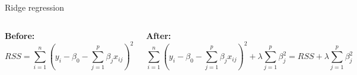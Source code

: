\documentclass[aspectratio=169,usenames,dvipsnames]{beamer}
\newcommand{\InstructorList}[1]{
\begin{itemize}
	\color{orange}
	#1
\end{itemize}
}
\renewcommand{\InstructorList}[1]{}
\begin{document}
\begin{frame}[t]{Ridge regression}

\begin{columns}
\centering
\textbf{Before:}
\footnotesize
\begin{equation*}
	RSS = \sum_{i=1}^n \left(y_i - \beta_0 - \sum_{j=1}^p \beta_j x_{ij}\right)^2
\end{equation*}

\centering
\textbf{After:}
\begin{equation*}
	\sum_{i=1}^n \left(y_i - \beta_0 - \sum_{j=1}^p \beta_j x_{ij}\right)^2 + \lambda \sum_{j=1}^p \beta_j^2 = RSS + \lambda \sum_{j=1}^p \beta_j^2
\end{equation*}

\end{columns}


\begin{columns}
\centering
\footnotesize
\InstructorList{
\item $\lambda \geq 0$ is a tuning paramter to figure out separately.
\item Second term is called ``shrinkage penalty''
\item $\lambda = 0$ means least squares estimate
\item first encouter of regularization, $l_2$ norm, $l_p$ norm
\item regularization = constrain = less flexibility
}
\centering

\footnotesize
\InstructorList{
\item As $\lambda \to \infty$ impact of shrinkage penalty grows, ridge regression coeff will go towards 0
\item Not applied to the intercept
\item call coefficients found by ridge regression $\hat \beta_\lambda^R = (\beta_{1,\lambda}^R, \cdots,\beta_{p,\lambda}^R \cdots )$
}
\end{columns}

\end{frame}
\end{document}
